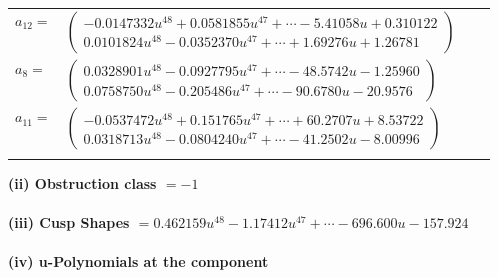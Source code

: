 \documentclass[1p]{elsarticle_modified}
\theoremstyle{definition}
\begin{document}
\begin{tabular}{m{7pt} m{180pt} m{7pt} m{180pt} }
\flushright $a_{12}=$&$\begin{pmatrix}-0.0147332 u^{48}+0.0581855 u^{47}+\cdots-5.41058 u+0.310122\\0.0101824 u^{48}-0.0352370 u^{47}+\cdots+1.69276 u+1.26781\end{pmatrix}$ \\
\flushright $a_{8}=$&$\begin{pmatrix}0.0328901 u^{48}-0.0927795 u^{47}+\cdots-48.5742 u-1.25960\\0.0758750 u^{48}-0.205486 u^{47}+\cdots-90.6780 u-20.9576\end{pmatrix}$ \\
\flushright $a_{11}=$&$\begin{pmatrix}-0.0537472 u^{48}+0.151765 u^{47}+\cdots+60.2707 u+8.53722\\0.0318713 u^{48}-0.0804240 u^{47}+\cdots-41.2502 u-8.00996\end{pmatrix}$\\&\end{tabular}
\flushleft \textbf{(ii) Obstruction class $= -1$}\\~\\
\flushleft \textbf{(iii) Cusp Shapes $= 0.462159 u^{48}-1.17412 u^{47}+\cdots-696.600 u-157.924$}\\~\\
\newpage\renewcommand{\arraystretch}{1}
\flushleft \textbf{(iv) u-Polynomials at the component}\newline \\
\end{document}

